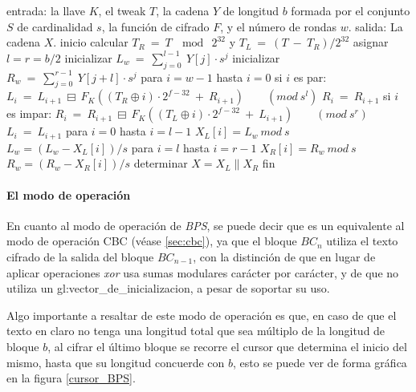 \begin{pseudocodigo}[caption={Proceso de descifrado $BC^{-1}$.},
label={descifrado_BC}]
  entrada:    la llave $K$, el tweak $T$, la cadena $Y$ de longitud $b$ formada por el conjunto $S$
              de cardinalidad $s$, la función de cifrado $F$, y el número de rondas $w$.
  salida:     La cadena $X$.
  inicio
    calcular $T_R\: =\: T\: \mod\: 2^{32}$ y $T_L\: =\: (T\: -\: T_R) / 2^{32}$
    asignar $l = r = b/2$
    inicializar $L_w\: =\: \sum_{j=0}^{l-1}\: Y[j] \cdot s^j$
    inicializar $R_w\: =\: \sum_{j=0}^{r-1}\: Y[j+l] \cdot s^j$
    para $i=w-1$ hasta $i=0$
    si $i$ es par:
      $L_i\: =\: L_{i+1}\: \boxminus\: F_K((T_R \oplus i) \cdot 2^{f-32}\: +\: R_{i+1})\qquad (mod\ s^l)$
      $R_i\: =\: R_{i+1}$
    si $i$ es impar:
      $R_i\: =\: R_{i+1}\: \boxminus\: F_K((T_L \oplus i) \cdot 2^{f-32}\: +\: L_{i+1})\qquad (mod\ s^r)$
      $L_i\: =\: L_{i+1}$
    para $i=0$ hasta $i=l-1$
      $X_L[i] = L_w\ mod\ s$
      $L_w = (L_w - X_L[i])/s$
    para $i=l$ hasta $i=r-1$
      $X_R[i] = R_w\ mod\ s$
      $R_w = (R_w - X_R[i])/s$
    determinar $X = X_L \parallel X_R$
  fin
\end{pseudocodigo}


\paragraph{El modo de operación}

En cuanto al modo de operación de \textit{BPS}, se puede decir que es un
equivalente al modo de operación CBC (véase \ref{sec:cbc}), ya que el bloque
$BC_n$ utiliza el texto cifrado de la salida del bloque $BC_{n-1}$, con la
distinción de que en lugar de aplicar operaciones \textit{xor} usa sumas
modulares carácter por carácter, y de que no utiliza un
\gls{gl:vector_de_inicializacion}, a pesar de soportar su uso.

Algo importante a resaltar de este modo de operación es que, en caso de que el
texto en claro no tenga una longitud total que sea múltiplo de la longitud de
bloque $b$, al cifrar el último bloque se recorre el cursor que determina
el inicio del mismo, hasta que su longitud concuerde con $b$, esto se puede
ver de forma gráfica en la figura \ref{cursor_BPS}.

